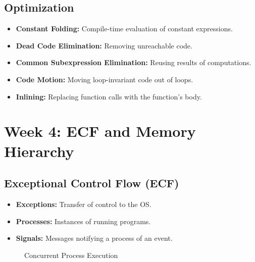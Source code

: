 \documentclass[10pt]{article}
\begin{document}
\subsection{Optimization}
\begin{itemize}
    \item \textbf{Constant Folding:} Compile-time evaluation of constant expressions.
    \item \textbf{Dead Code Elimination:} Removing unreachable code.
    \item \textbf{Common Subexpression Elimination:} Reusing results of computations.
    \item \textbf{Code Motion:} Moving loop-invariant code out of loops.
    \item \textbf{Inlining:} Replacing function calls with the function's body.
\end{itemize}

\section{Week 4: ECF and Memory Hierarchy}

\subsection{Exceptional Control Flow (ECF)}
\begin{itemize}
    \item \textbf{Exceptions:} Transfer of control to the OS.
    \item \textbf{Processes:} Instances of running programs.
    \item \textbf{Signals:} Messages notifying a process of an event.
\end{itemize}
\begin{figure}[h]
    \centering
    \caption{Concurrent Process Execution}
\end{figure}
\end{document}

